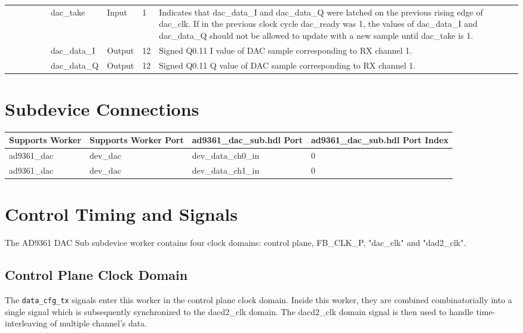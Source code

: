 \documentclass{article}
\def\comp{ad9361\_dac\_sub}
\def\Comp{AD9361 DAC Sub}
\begin{document}
\begin{landscape}
\begin{scriptsize}
\begin{longtable}{|p{1.75cm}|p{2.25cm}|p{1.25cm}|p{1.25cm}|p{1.25cm}|p{3cm}|p{1.4cm}|p{0.9cm}|p{6.88cm}|}
			\cline{6-9}
			&             &        &     &      & dac\_take    & Input     & 1      & Indicates that dac\_data\_I and dac\_data\_Q were latched on the previous rising edge of dac\_clk. If in the previous clock cycle dac\_ready was 1, the values of dac\_data\_I and dac\_data\_Q should not be allowed to update with a new sample until dac\_take is 1. \\
			\cline{6-9}
			&             &        &     &      & dac\_data\_I & Output    & 12     & Signed Q0.11 I value of DAC sample corresponding to RX channel 1. \\
			\cline{6-9}
			&             &        &     &      & dac\_data\_Q & Output    & 12     & Signed Q0.11 Q value of DAC sample corresponding to RX channel 1. \\
			\hline
		\end{longtable}
	\end{scriptsize}
	
	\section*{Subdevice Connections}
	\begin{scriptsize}
		\begin{tabular}{|p{5cm}|p{5cm}|p{5cm}|p{7.22cm}|}
			\hline
			\rowcolor{blue}
			Supports Worker & Supports Worker Port & \comp{}.hdl Port     & \comp{}.hdl Port Index \\
			\hline
			ad9361\_dac     & dev\_dac             & dev\_data\_ch0\_in & 0 \\
			\hline
			ad9361\_dac     & dev\_dac             & dev\_data\_ch1\_in & 0 \\
			\hline
		\end{tabular}
	\end{scriptsize}

\end{landscape}

\section*{Control Timing and Signals}
The \Comp{} subdevice worker contains four clock domains: control plane, FB\_CLK\_P, "dac\_clk" and "dad2\_clk".
\subsection*{Control Plane Clock Domain}
The \verb+data_cfg_tx+ signals enter this worker in the control plane clock domain. Inside this worker, they are combined combinatorially into a single signal which is subsequently synchronized to the dacd2\_clk domain. The dacd2\_clk domain signal is then used to handle time-interleaving of multiple channel's data.
\end{document}

